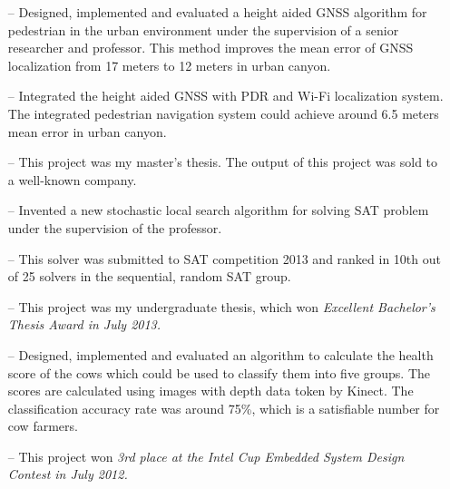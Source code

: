 \documentclass[10pt,a4paper,roman]{moderncv}        %
\begin{document}
\begin{itemize}
  \item[--]{Designed, implemented and evaluated a height aided GNSS algorithm for
    pedestrian in the urban environment under the supervision of a senior researcher
  and professor. This method improves the mean error of GNSS localization from 17 meters to 12 meters in urban canyon.}
  \item[--]{Integrated the height aided GNSS with PDR and Wi-Fi localization system. The integrated pedestrian navigation system could achieve around 6.5 meters mean error in urban canyon.}
  \item[--]{This project was my master's thesis. The output of this project was sold to a well-known company.}
\end{itemize}

\begin{itemize}
  \item[--]{Invented a new stochastic local search algorithm for solving SAT problem under the supervision of the professor.}
  \item[--]{This solver was submitted to SAT competition 2013 and ranked in 10th out of 25 solvers in the sequential, random SAT group.}
  \item[--]{This project was my undergraduate thesis, which won \em{Excellent
Bachelor's Thesis Award} in July 2013.}
\end{itemize}

\begin{itemize}
  \item[--]{Designed, implemented and evaluated an algorithm to calculate the health
    score of the cows which could be used to classify them into five groups. The
  scores are calculated using images with depth data token by Kinect. The
classification accuracy rate was around 75\%, which is a satisfiable number for
cow farmers.}
  \item[--]{This project won \em{3rd place at the Intel Cup Embedded System
Design Contest} in July 2012.}
\end{itemize}
\end{document}
